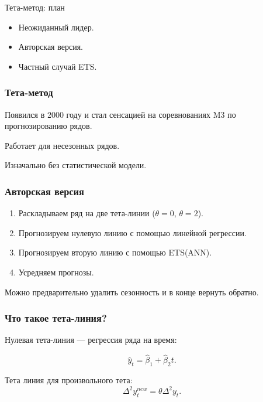 
\begin{frame} %


\end{frame}


\begin{frame}{Тета-метод: план}
  \begin{itemize}[<+->]
    \item Неожиданный лидер. 
    \item Авторская версия.
    \item Частный случай ETS. 
  \end{itemize}
\end{frame}


\begin{frame}
    \frametitle{Тета-метод}

    Появился в 2000 году и стал сенсацией на \alert{соревнованиях M3} по прогнозированию рядов. 

    \pause

    Работает для \alert{несезонных} рядов. 

    \pause 

    Изначально \alert{без статистической модели}. 

\end{frame}


\begin{frame}
    \frametitle{Авторская версия}

    \begin{enumerate}[<+->]
        \item Раскладываем ряд на две тета-линии ($\theta=0$, $\theta = 2$).
        \item Прогнозируем нулевую линию с помощью линейной регрессии. 
        \item Прогнозируем вторую линию с помощью ETS(ANN).
        \item Усредняем прогнозы.
      \end{enumerate}

      \pause
      Можно предварительно удалить сезонность и в конце вернуть обратно. 

\end{frame}

\begin{frame}
    \frametitle{Что такое тета-линия?}

    Нулевая тета-линия — \alert{регрессия} ряда на время:

    \[
    \hat y_t = \hat \beta_1 + \hat \beta_2 t.    
    \]
    \pause
    
    Тета линия для произвольного тета:
    \[
        \Delta^2 y^{new}_t = \theta \Delta^2 y_t.
    \]

\end{frame}


